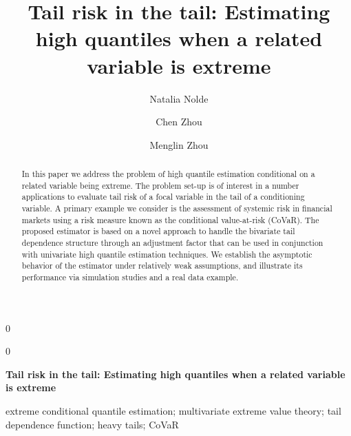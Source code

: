 \documentclass[11pt,letterpaper]{article}
\def\nt{\noindent}
\numberwithin{equation}{section}
\newcommand{\blind}{0}
\begin{document}
\def\spacingset#1{\renewcommand{\baselinestretch}%
{#1}\small\normalsize} \spacingset{1}

\blind
{
 \title{\bf Tail risk in the tail: Estimating high quantiles when a related variable is extreme}
  \author[1]{Natalia Nolde}
\author[2]{Chen Zhou}
\author[1]{Menglin Zhou}

  \maketitle
} \fi

\blind
{
  \bigskip
  \bigskip
  \bigskip
  \begin{center}
  
{\LARGE\bf Tail risk in the tail: Estimating high quantiles when a related variable is extreme}
\end{center}
  \medskip
} \fi

\bigskip
\begin{abstract}

In this paper we address the problem of high quantile estimation conditional on a related variable being extreme. The problem set-up is of interest in a number applications to evaluate tail risk of a focal variable in the tail of a conditioning variable. A primary example we consider is the assessment of systemic risk in financial markets using a risk measure known as the conditional value-at-risk (CoVaR). The proposed estimator is based on a novel approach  to handle the bivariate tail dependence structure through an adjustment factor that can be used in conjunction with univariate high quantile estimation techniques. We establish the asymptotic behavior of the estimator under relatively weak assumptions, and illustrate its performance via simulation studies and a real data example.

\end{abstract}

\nt{\it Key words:} extreme conditional quantile estimation; multivariate extreme value theory; tail dependence function;
heavy tails; CoVaR

\vfill

\newpage

\spacingset{1.8}

\makeatletter
\newcommand{\leqnomode}{\tagsleft@true\let\veqno\@@leqno}
\newcommand{\reqnomode}{\tagsleft@false\let\veqno\@@eqno}
\makeatother
\end{document}
